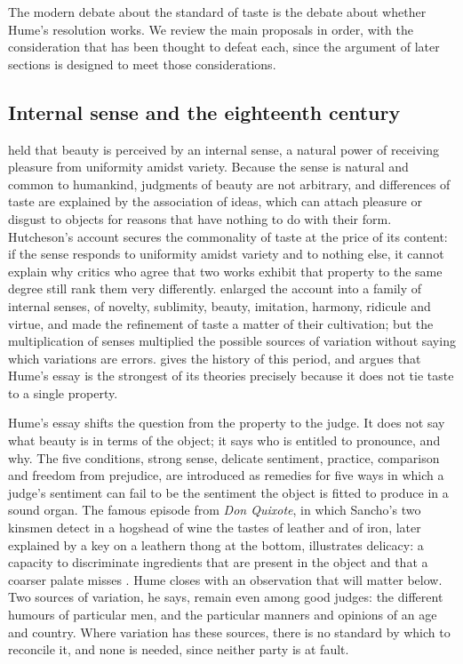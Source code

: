 \documentclass{situationist-preprint}
\begin{document}
The modern debate about the standard of taste is the debate about whether Hume's resolution works. We review the main proposals in order, with the consideration that has been thought to defeat each, since the argument of later sections is designed to meet those considerations.

\subsection{Internal sense and the eighteenth century}

\citet{Hutcheson1725} held that beauty is perceived by an internal sense, a natural power of receiving pleasure from uniformity amidst variety. Because the sense is natural and common to humankind, judgments of beauty are not arbitrary, and differences of taste are explained by the association of ideas, which can attach pleasure or disgust to objects for reasons that have nothing to do with their form. Hutcheson's account secures the commonality of taste at the price of its content: if the sense responds to uniformity amidst variety and to nothing else, it cannot explain why critics who agree that two works exhibit that property to the same degree still rank them very differently. \citet{Gerard1759} enlarged the account into a family of internal senses, of novelty, sublimity, beauty, imitation, harmony, ridicule and virtue, and made the refinement of taste a matter of their cultivation; but the multiplication of senses multiplied the possible sources of variation without saying which variations are errors. \citet{Dickie1996} gives the history of this period, and argues that Hume's essay is the strongest of its theories precisely because it does not tie taste to a single property.

Hume's essay shifts the question from the property to the judge. It does not say what beauty is in terms of the object; it says who is entitled to pronounce, and why. The five conditions, strong sense, delicate sentiment, practice, comparison and freedom from prejudice, are introduced as remedies for five ways in which a judge's sentiment can fail to be the sentiment the object is fitted to produce in a sound organ. The famous episode from \emph{Don Quixote}, in which Sancho's two kinsmen detect in a hogshead of wine the tastes of leather and of iron, later explained by a key on a leathern thong at the bottom, illustrates delicacy: a capacity to discriminate ingredients that are present in the object and that a coarser palate misses \citep{Hume1757}. Hume closes with an observation that will matter below. Two sources of variation, he says, remain even among good judges: the different humours of particular men, and the particular manners and opinions of an age and country. Where variation has these sources, there is no standard by which to reconcile it, and none is needed, since neither party is at fault.
\end{document}
